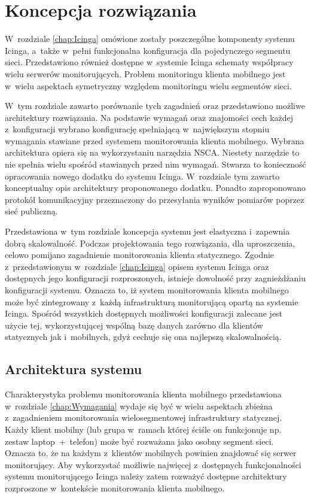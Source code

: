 \chapter{Koncepcja rozwiązania}
\label{chap:ProjektSystemu}

W~rozdziale \ref{chap:Icinga} omówione zostały poszczególne komponenty
systemu Icinga, a~także w~pełni funkcjonalna konfiguracja dla
pojedynczego segmentu sieci. Przedstawiono również dostępne w~systemie
Icinga schematy współpracy wielu serwerów monitorujących. Problem
monitoringu klienta mobilnego jest w~wielu aspektach symetryczny
względem monitoringu wielu segmentów sieci.

W~tym rozdziale zawarto porównanie tych zagadnień oraz przedstawiono
możliwe architektury rozwiązania. Na podstawie wymagań oraz znajomości
cech każdej z~konfiguracji wybrano konfigurację spełniającą
w~największym stopniu wymagania stawiane przed systemem monitorowania
klienta mobilnego. Wybrana architektura opiera się na wykorzystaniu
narzędzia NSCA. Niestety narzędzie to nie spełnia wielu spośród
stawianych przed nim wymagań. Stwarza to konieczność opracowania
nowego dodatku do systemu Icinga. W~rozdziale tym zawarto konceptualny
opis architektury proponowanego dodatku. Ponadto zaproponowano
protokół komunikacyjny przeznaczony do przesyłania wyników pomiarów
poprzez sieć publiczną.

Przedstawiona w~tym rozdziale koncepcja systemu jest elastyczna
i~zapewnia dobrą skalowalność. Podczas projektowania tego rozwiązania,
dla uproszczenia, celowo pomijano zagadnienie monitorowania klienta
statycznego. Zgodnie z~przedstawionym w~rozdziale \ref{chap:Icinga}
opisem systemu Icinga oraz dostępnych jego konfiguracji rozproszonych,
istnieje dowolność przy zagnieżdżaniu konfiguracji systemu. Oznacza
to, iż system monitorowania klienta mobilnego może być zintegrowany
z~każdą infrastrukturą monitorującą opartą na systemie Icinga. Spośród
wszystkich dostępnych możliwości konfiguracji zalecane jest użycie
tej, wykorzystującej wspólną bazę danych zarówno dla klientów
statycznych jak i~mobilnych, gdyż cechuje się ona najlepszą
skalowalnością.

\section[Architektura systemu][Architektura systemu]{Architektura
  systemu}

Charakterystyka problemu monitorowania klienta mobilnego przedstawiona
w~rozdziale \ref{chap:Wymagania} wydaje się być w wielu aspektach
zbieżna z~zagadnieniem monitorowania wielosegmentowej infrastruktury
statycznej. Każdy klient mobilny (lub grupa w~ramach której ściśle on
funkcjonuje np. zestaw laptop~+~telefon) może być rozważana jako
osobny segment sieci. Oznacza to, że na każdym z~klientów mobilnych
powinien znajdować się serwer monitorujący. Aby wykorzystać możliwie
najwięcej z~dostępnych funkcjonalności systemu monitorującego Icinga
należy zatem rozważyć dostępne architektury rozproszone w~kontekście
monitorowania klienta mobilnego.

